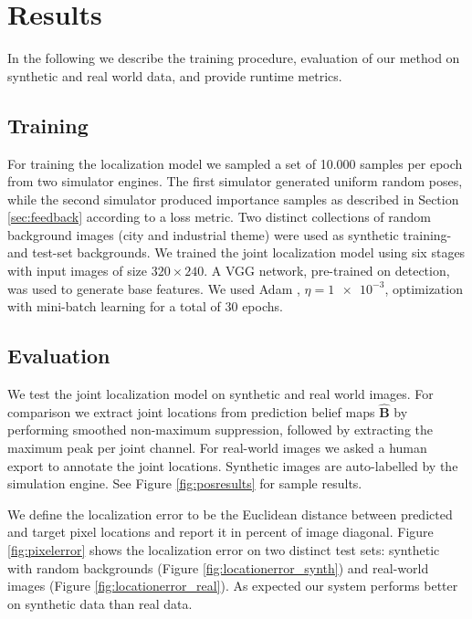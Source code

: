 \documentclass[conference]{IEEEtran}
\begin{document}
\section{Results}

    In the following we describe the training procedure, evaluation of our method on synthetic and real world data, and provide runtime metrics.

    \subsection{Training}
    For training the localization model we sampled a set of 10.000 samples per epoch from two simulator engines. The first simulator generated uniform random poses, while the second simulator produced importance samples as described in Section \ref{sec:feedback} according to a loss metric. Two distinct collections of random background images (city and industrial theme) were used as synthetic training- and test-set backgrounds. We trained the joint localization model using six stages with input images of size $320 \times 240$. A VGG network, pre-trained on detection, was used to generate base features. We used Adam \cite{kingma2014adam}, $\eta=\num{1e-3}$, optimization with mini-batch learning for a total of 30 epochs.

    \subsection{Evaluation}
    We test the joint localization model on synthetic and real world images. For comparison we extract joint locations from prediction belief maps $\hat{\mathbf{B}}$ by performing smoothed non-maximum suppression, followed by extracting the maximum peak per joint channel. For real-world images we asked a human export to annotate the joint locations. Synthetic images are auto-labelled by the simulation engine. See Figure \ref{fig:posresults} for sample results.
    
    We define the localization error to be the Euclidean distance between predicted and target pixel locations and report it in percent of image diagonal. Figure \ref{fig:pixelerror} shows the localization error on two distinct test sets: synthetic with random backgrounds (Figure \ref{fig:locationerror_synth}) and real-world images (Figure \ref{fig:locationerror_real}). As expected our system performs better on synthetic data than real data. 
\end{document}

